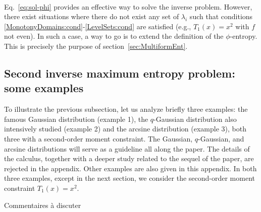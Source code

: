 \documentclass[entropy,article,submit,moreauthors,pdftex]{Definitions/mdpi}
\newcommand{\jfb}[1]{{\color{red} #1}}
\begin{document}
\

Eq.~\eqref{eq:sol-phi}  provides   an  effective   way  to  solve   the  inverse
problem. However,  there exist situations  where there do  not exist any  set of
$\lambda_i$ such that conditions \ref{MonotonyDomains:cond}-\ref{LevelSets:cond}
are satisfied (e.g., $T_1(x) = x^2$ with $f$ not even). In such a case, a way to
go is  to extend the  definition of the  $\phi$-entropy.  This is  precisely the
purpose of section~\ref{sec:MultiformEnt}.




\subsection{Second inverse maximum entropy problem: some examples}

To illustrate  the previous subsection,  let us analyze briefly  three examples:
the famous Gaussian distribution (example 1), the $q$-Gaussian distribution also
intensively studied (example  2) and the arcsine distribution  (example 3), both
three with  a second-order moment  constraint.  The Gaussian,  $q$-Gaussian, and
arcsine distributions will serve as a guideline all along the paper. The details
of the  calculus, together  with a  deeper study  related to  the sequel  of the
paper,  are rejected  in the  appendix. Other  examples are  also given  in this
appendix. In  both three examples, except  in the next section,  we consider the
second-order moment constraint $T_1(x) = x^2$.

\jfb{Commentaires à discuter}
\end{document}
